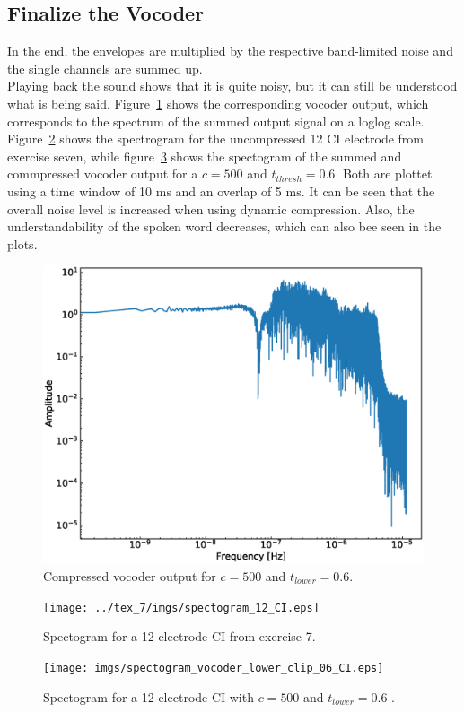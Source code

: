 \documentclass{scrartcl}			%
\begin{document}
\subsection{Finalize the Vocoder}
In the end, the envelopes are multiplied by the respective band-limited noise and the single channels are summed up.\\Playing back the sound shows that it is quite noisy, but it can still be understood what is being said. Figure~\ref{fig:dyn} shows the corresponding vocoder output, which corresponds to the spectrum of the summed output signal on a loglog scale. Figure~\ref{fig:ci_12_spec} shows the spectrogram for the uncompressed 12 CI electrode from exercise seven, while figure~\ref{fig:ci_12_spec_clip} shows the spectogram of the summed and commpressed vocoder output for a $c=500$ and $t_{thresh}=0.6$. Both are plottet using a time window of 10 ms and an overlap of 5 ms. It can be seen that the overall noise level is increased when using dynamic compression. Also, the understandability of the spoken word decreases, which can also bee seen in the plots.
\begin{figure}[H]
\centering
   		 \includegraphics[width=\linewidth]{imgs/vocoder_lower_clip_06.eps}
   		 \caption{Compressed vocoder output for $c=500$ and $t_{lower}=0.6$.} 
   		 \label{fig:dyn} 
\end{figure}
\begin{figure}[H]
\centering
   		 \texttt{[image: ../tex\_7/imgs/spectogram\_12\_CI.eps]}
   		 \caption{Spectogram for a 12 electrode CI from exercise 7.} 
   		 \label{fig:ci_12_spec} 
\end{figure}
\begin{figure}[H]
\centering
   		 \texttt{[image: imgs/spectogram\_vocoder\_lower\_clip\_06\_CI.eps]}
   		 \caption{Spectogram for a 12 electrode CI with $c=500$ and $t_{lower}=0.6$ .} 
   		 \label{fig:ci_12_spec_clip} 

\end{figure}
\end{document}
